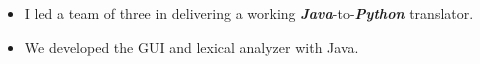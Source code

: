 \documentclass[10pt,a4paper,ragged2e,withhyper]{altacv}
\begin{document}
\begin{paracol}{2}
\divider


\begin{itemize}
\item I led a team of three in delivering a working \textbf{\textit{Java}}-to-\textbf{\textit{Python}} translator.  
\item We developed the GUI and lexical analyzer with Java.
\end{itemize}

\medskip













\end{paracol}
\end{document}
